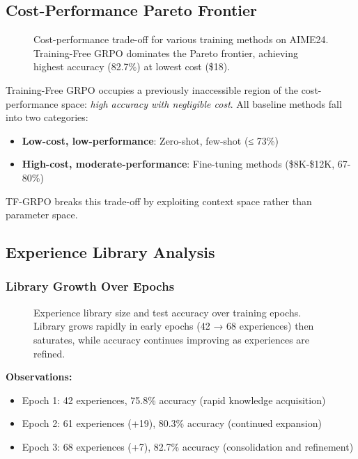 \documentclass[11pt,a4paper]{article}
\begin{document}
\subsection{Cost-Performance Pareto Frontier}

\begin{figure}[h]
\centering
{}
\caption{Cost-performance trade-off for various training methods on AIME24. Training-Free GRPO dominates the Pareto frontier, achieving highest accuracy (82.7\%) at lowest cost (\$18).}
\label{fig:pareto}
\end{figure}

Training-Free GRPO occupies a previously inaccessible region of the cost-performance space: \textit{high accuracy with negligible cost}. All baseline methods fall into two categories:
\begin{itemize}
    \item \textbf{Low-cost, low-performance}: Zero-shot, few-shot (≤ 73\%)
    \item \textbf{High-cost, moderate-performance}: Fine-tuning methods (\$8K-\$12K, 67-80\%)
\end{itemize}

TF-GRPO breaks this trade-off by exploiting context space rather than parameter space.

\subsection{Experience Library Analysis}

\subsubsection{Library Growth Over Epochs}

\begin{figure}[h]
\centering
{}
\caption{Experience library size and test accuracy over training epochs. Library grows rapidly in early epochs (42 → 68 experiences) then saturates, while accuracy continues improving as experiences are refined.}
\label{fig:library_growth}
\end{figure}

\textbf{Observations:}
\begin{itemize}
    \item Epoch 1: 42 experiences, 75.8\% accuracy (rapid knowledge acquisition)
    \item Epoch 2: 61 experiences (+19), 80.3\% accuracy (continued expansion)
    \item Epoch 3: 68 experiences (+7), 82.7\% accuracy (consolidation and refinement)
\end{itemize}
\end{document}
